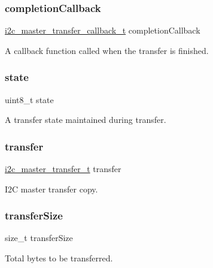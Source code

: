 \subsubsection{\texorpdfstring{completionCallback}{completionCallback}}
{\footnotesize\ttfamily \mbox{\hyperlink{group__i2c__driver_gafa39d30cd808d79b774361874f227204}{i2c\+\_\+master\+\_\+transfer\+\_\+callback\+\_\+t}} completion\+Callback}

A callback function called when the transfer is finished. \mbox{\label{struct__i2c__master__handle_a0b57aa10271a66f3dc936bba1d2f3830}} 
\subsubsection{\texorpdfstring{state}{state}}
{\footnotesize\ttfamily uint8\+\_\+t state}

A transfer state maintained during transfer. \mbox{\label{struct__i2c__master__handle_a9f792796934731101c55954d82000811}} 
\subsubsection{\texorpdfstring{transfer}{transfer}}
{\footnotesize\ttfamily \mbox{\hyperlink{group__i2c__driver_ga0e25c3c153992361c8d359a86b70d3c6}{i2c\+\_\+master\+\_\+transfer\+\_\+t}} transfer}

I2C master transfer copy. \mbox{\label{struct__i2c__master__handle_a10e6d1f095e525fa85ffe957081ed7a7}} 
\subsubsection{\texorpdfstring{transferSize}{transferSize}}
{\footnotesize\ttfamily size\+\_\+t transfer\+Size}

Total bytes to be transferred. \mbox{\label{struct__i2c__master__handle_a2e294dd14122c554baa0665072b4ca7a}} 
